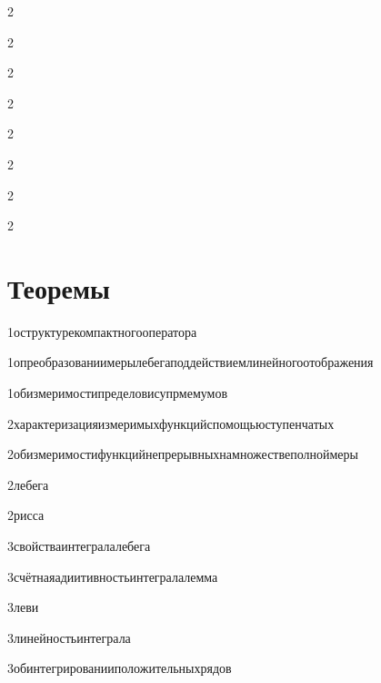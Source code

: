 {2}{}

{2}{}

{2}{}

{2}{}

{2}{}

{2}{}

{2}{}

{2}{}


\section{Теоремы}

{1}{оструктурекомпактногооператора}

{1}{опреобразованиимерылебегаподдействиемлинейногоотображения}

{1}{обизмеримостипределовисупрмемумов}

{2}{характеризацияизмеримыхфункцийспомощьюступенчатых}

{2}{обизмеримостифункцийнепрерывныхнамножествеполноймеры}

{2}{лебега}

{2}{рисса}

{3}{свойстваинтегралалебега}

{3}{счётнаяадиитивностьинтегралалемма}

{3}{леви}

{3}{линейностьинтеграла}

{3}{обинтегрированииположительныхрядов}

